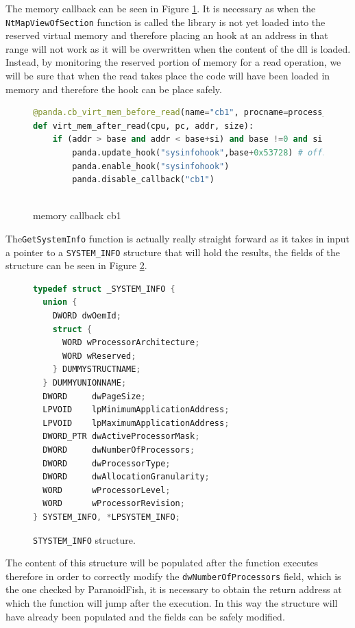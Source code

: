 The memory callback can be seen in Figure \ref{fig:cb1}. It is necessary as when the \lstinline{NtMapViewOfSection} function is called the library is not yet loaded into the reserved virtual memory and therefore placing an hook at an address in that range will not work as it will be overwritten when the content of the dll is loaded. Instead, by monitoring the reserved portion of memory for a read operation, we will be sure that when the read takes place the code will have been loaded in memory and therefore the hook can be place safely. 

\begin{figure}[htp]
\centering
\begin{lstlisting}[language=Python] 
@panda.cb_virt_mem_before_read(name="cb1", procname=process_name, enabled=False)
def virt_mem_after_read(cpu, pc, addr, size):
    if (addr > base and addr < base+si) and base !=0 and si !=0:
        panda.update_hook("sysinfohook",base+0x53728) # offset of GetSystemInfo
        panda.enable_hook("sysinfohook")
        panda.disable_callback("cb1")
        
\end{lstlisting}
\caption{memory callback cb1}
\label{fig:cb1}
\end{figure}

The\lstinline{GetSystemInfo} function is actually really straight forward as it takes in input a pointer to a \lstinline{SYSTEM_INFO} structure that will hold the results, the fields of the structure can be seen in Figure \ref{fig:sysinfo}.

\begin{figure}[htp]
\centering
\begin{lstlisting}[language=C++] 
typedef struct _SYSTEM_INFO {
  union {
    DWORD dwOemId;
    struct {
      WORD wProcessorArchitecture;
      WORD wReserved;
    } DUMMYSTRUCTNAME;
  } DUMMYUNIONNAME;
  DWORD     dwPageSize;
  LPVOID    lpMinimumApplicationAddress;
  LPVOID    lpMaximumApplicationAddress;
  DWORD_PTR dwActiveProcessorMask;
  DWORD     dwNumberOfProcessors;
  DWORD     dwProcessorType;
  DWORD     dwAllocationGranularity;
  WORD      wProcessorLevel;
  WORD      wProcessorRevision;
} SYSTEM_INFO, *LPSYSTEM_INFO;
\end{lstlisting}
\caption{\lstinline{STYSTEM_INFO} structure.}
\label{fig:sysinfo}
\end{figure}

The content of this structure will be populated after the function executes therefore in order to correctly modify the \lstinline{dwNumberOfProcessors} field, which is the one checked by ParanoidFish, it is necessary to obtain the return address at which the function will jump after the execution. In this way the structure will have already been populated and the fields can be safely modified.


